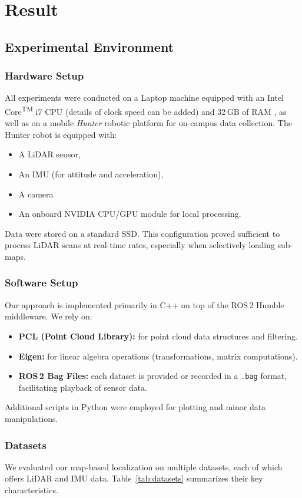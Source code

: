 \chapter{Result }
\label{ch:intro}

\section{Experimental Environment}

\subsection{Hardware Setup}
All experiments were conducted on a Laptop machine equipped with an Intel\textsuperscript{\textregistered} Core\textsuperscript{TM} i7 CPU (details of clock speed can be added) and 32\,GB of RAM , as well as on a mobile \emph{Hunter} robotic platform for on-campus data collection. The Hunter robot is equipped with:
\begin{itemize}
    \item A LiDAR sensor,
    \item An IMU (for attitude and acceleration),
    \item A camera
    \item An onboard NVIDIA CPU/GPU module for local processing.
\end{itemize}
Data were stored on a standard SSD. This configuration proved sufficient to process LiDAR scans at real-time rates, especially when selectively loading sub-maps.

\subsection{Software Setup}
Our approach is implemented primarily in C++ on top of the ROS\,2 Humble middleware. We rely on:
\begin{itemize}
  \item \textbf{PCL (Point Cloud Library):} for point cloud data structures and filtering.
  \item \textbf{Eigen:} for linear algebra operations (transformations, matrix computations).
  \item \textbf{ROS\,2 Bag Files:} each dataset is provided or recorded in a \texttt{.bag} format, facilitating playback of sensor data.
\end{itemize}
Additional scripts in Python were employed for plotting and minor data manipulations.

\subsection{Datasets}
We evaluated our map-based localization on multiple datasets, each of which offers LiDAR and IMU data. Table~\ref{tab:datasets} summarizes their key characteristics.

